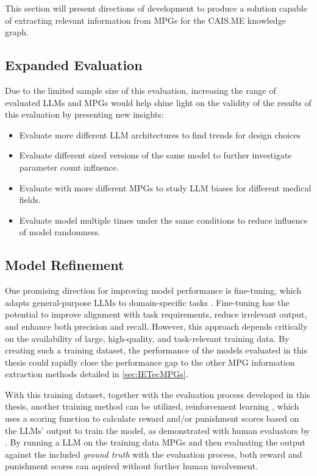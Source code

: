 \documentclass[bs, english]{stthesis}
\begin{document}
This section will present directions of development to produce a solution capable of extracting relevant information from MPGs for the CAIS.ME knowledge graph.

\subsection{Expanded Evaluation}

Due to the limited sample size of this evaluation, increasing the range of evaluated LLMs and MPGs would help shine light on the validity of the results of this evaluation by presenting new insights:

\begin{itemize}
  \item Evaluate more different LLM architectures to find trends for design choices
  \item Evaluate different sized versions of the same model to further investigate parameter count influence.
  \item Evaluate with more different MPGs to study LLM biases for different medical fields.
  \item Evaluate model multiple times under the same conditions to reduce influence of model randomness.
\end{itemize}

\subsection{Model Refinement}

One promising direction for improving model performance is fine-tuning, which adapts general-purpose LLMs to domain-specific tasks \cite{howardUniversalLanguageModel2018}. Fine-tuning has the potential to improve alignment with task requirements, reduce irrelevant output, and enhance both precision and recall. However, this approach depends critically on the availability of large, high-quality, and task-relevant training data. By creating such a training dataset, the performance of the models evaluated in this thesis could rapidly close the performance gap to the other MPG information extraction methods detailed in \cref{sec:IETecMPGs}.

With this training dataset, together with the evaluation process developed in this thesis, another training method can be utilized, reinforcement learning \cite{sutton1998reinforcement}, which uses a scoring function to calculate reward and/or punishment scores based on the LLMs' output to train the model, as demonstrated with human evaluators by \citeauthor{zieglerFineTuningLanguageModels2020} \cite{zieglerFineTuningLanguageModels2020}. By running a LLM on the training data MPGs and then evaluating the output against the included \textit{ground truth} with the evaluation process, both reward and punishment scores can aquired without further human involvement.
\end{document}
